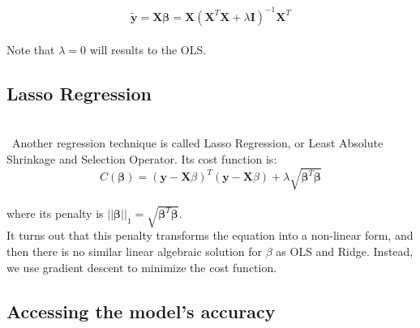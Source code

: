 \documentclass{article}
\begin{document}
\begin{equation}
\label{eq8}
\boldsymbol{\tilde{y}} = \boldsymbol{X\beta} = \boldsymbol{X}(\boldsymbol{X}^T\boldsymbol{X}  + \lambda \boldsymbol{I})^{-1}\boldsymbol{X}^T
\end{equation}\\

Note that $\lambda=0$ will results to the OLS.\\

\subsection{Lasso Regression}\\

\quad \, Another regression technique is called Lasso Regression, or Least Absolute Shrinkage and Selection Operator. Its cost function is:\\

$$C(\boldsymbol{\beta}) = (\boldsymbol{y} - \boldsymbol{X}\beta)^T(\boldsymbol{y} - \boldsymbol{X}\beta) + \lambda \sqrt{\boldsymbol{\beta}^T\boldsymbol{\beta}}$$\\

\noindent where its penalty is $||\boldsymbol{\beta}||_1 = \sqrt{\boldsymbol{\beta}^T\boldsymbol{\beta}}$.\\

It turns out that this penalty transforms the equation into a non-linear form, and then there is no similar linear algebraic solution for $\beta$ as OLS and Ridge. Instead, we use gradient descent to minimize the cost function. \\

\subsection{Accessing the model's accuracy}\\
\end{document}
